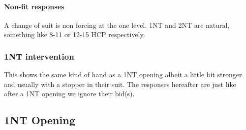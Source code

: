 \documentclass[a4paper]{article}
\begin{document}
\paragraph{Non-fit responses}

A change of suit is non forcing at the one level. 1NT and 2NT are natural,
something like 8-11 or 12-15 HCP respectively.
\bigbreak
\subsubsection{1NT intervention}

This shows the same kind of hand as a 1NT opening albeit a little bit stronger
and usually with a stopper in their suit.
\bigbreak
The responses hereafter are just like after a 1NT opening we ignore their
bid(s).
\bigbreak
\subsection{1NT Opening}
\end{document}
